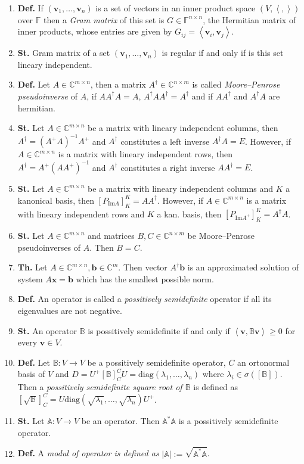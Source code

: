 \documentclass{article}
\newcommand{\<}{\left<}
\renewcommand{\>}{\right>}
\newcommand{\im}{\text{Im}}
\newcommand{\diag}{\text{diag}}
\newcommand*\op[1]{\mathbb{#1}}
\newcommand{\C}{\mathbb{C}}
\newcommand{\F}{\mathbb{F}}
\newcommand{\define}{\textbf{Def. }}
\newcommand{\state}{\textbf{St. }}
\newcommand{\theor}{\textbf{Th. }}
\begin{document}
\begin{multicols}{3}
\begin{enumerate}[itemsep=2pt, topsep=2pt, partopsep=2pt, parsep=2pt]
        \item \define If $(\bm v_1,\ldots,\bm v_n)$ is a set of vectors in an inner product space $(V,\<,\>)$ over $\F$ then a \emph{Gram matrix} of this set is $G\in\F^{n\times n}$, the Hermitian matrix of inner products, whose entries are given by $G_{ij}=\<\bm v_i,\bm v_j\>$.
        \item \state Gram matrix of a set $(\bm v_1,\ldots,\bm v_n)$ is regular if and only if is this set lineary independent.
        \item \define Let $A\in\C^{m\times n}$, then a matrix $A^\dagger\in\C^{n\times m}$ is called \emph{Moore–Penrose pseudoinverse} of $A$, if $AA^\dagger A=A$, $A^\dagger AA^\dagger=A^\dagger$ and if $AA^\dagger$ and $A^\dagger A$ are hermitian.
        \item \state Let $A\in\C^{m\times n}$ be a matrix with lineary independent columns, then $A^\dagger =(A^+A)^{-1}A^+$ and $A^\dagger$ constitutes a left inverse $A^\dagger A=E$. However, if $A\in\C^{m\times n}$ is a matrix with lineary independent rows, then $A^\dagger =A^+(AA^+)^{-1}$ and $A^\dagger$ constitutes a right inverse $AA^\dagger=E$.
        \item \state Let $A\in\C^{m\times n}$ be a matrix with lineary independent columns and $K$ a kanonical basis, then $[P_{\im A}]_K^K=AA^\dagger$. However, if $A\in\C^{m\times n}$ is a matrix with lineary independent rows and $K$ a kan. basis, then $[P_{\im A^+}]_K^K=A^\dagger A$.
        \item \state Let $A\in\C^{m\times n}$ and matrices $B,C\in\C^{n\times m}$ be Moore–Penrose pseudoinverses of $A$. Then $B=C$.
        \item \theor Let $A\in\C^{m\times n}, \bm b\in\C^m$. Then vector $A^\dagger\bm b$ is an approximated solution of system $A\bm x=\bm b$ which has the smallest possible norm.
        \item \define An operator is called a \emph{possitively semidefinite} operator if all its eigenvalues are not negative.
        \item \state An operator $\op B$ is possitively semidefinite if and only if $\<\bm v,\op B\bm v\>\geq 0$ for every $\bm v\in V$.
        \item \define Let $\op B:V\to V$ be a possitively semidefinite operator, $C$ an ortonormal basis of $V$ and $D=U^+[\op B]_C^CU=\diag(\lambda_1,\ldots,\lambda_n)$ where $\lambda_i\in\sigma([\op B])$. Then a \emph{possitively semidefinite square root of $\op B$} is defined as $[\sqrt{\op B}]_C^C=U\diag (\sqrt{\lambda_1},\ldots,\sqrt{\lambda_n})U^+$.
        \item \state Let $\op A:V\to V$ be an operator. Then $\op A^*\op A$ is a possitively semidefinite operator.
        \item \define A \emph{modul of operator is defined as} $|\op A|:=\sqrt{\op A^*\op A}$.


\end{enumerate}
\end{multicols}
\end{document}
